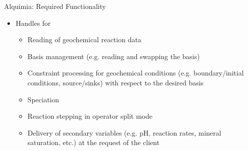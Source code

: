 \documentclass{beamer}
\begin{document}
\begin{frame}{Alquimia: Required Functionality}
\begin{itemize}
\item Handles for
\begin{itemize}
\item Reading of geochemical reaction data
\item Basis management (e.g. reading and swapping the basis)
\item Constraint processing for geochemical conditions (e.g. boundary/initial conditions, source/sinks) with respect to the desired basis
\item Speciation
\item Reaction stepping in operator split mode
\item Delivery of secondary variables (e.g. pH, reaction rates, mineral saturation, etc.) at the request of the client
\end{itemize}
\end{itemize}
\end{frame}
\end{document}
